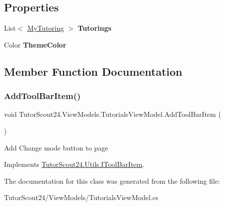 \subsection*{Properties}
\begin{DoxyCompactItemize}
\item 
\mbox{\label{class_tutor_scout24_1_1_view_models_1_1_tutorials_view_model_a119e28d438ac4f7009deb88987a38946}} 
List$<$ \mbox{\hyperlink{class_tutor_scout24_1_1_models_1_1_tutorings_1_1_my_tutoring}{My\+Tutoring}} $>$ {\bfseries Tutorings}
\item 
\mbox{\label{class_tutor_scout24_1_1_view_models_1_1_tutorials_view_model_ac8a656f47cb78d246739e144c3ddec1f}} 
Color {\bfseries Theme\+Color}
\end{DoxyCompactItemize}


\subsection{Member Function Documentation}
\mbox{\label{class_tutor_scout24_1_1_view_models_1_1_tutorials_view_model_aaf327ff2a3c770d55aa0bfa3b50786a7}} 
\subsubsection{\texorpdfstring{Add\+Tool\+Bar\+Item()}{AddToolBarItem()}}
{\footnotesize\ttfamily void Tutor\+Scout24.\+View\+Models.\+Tutorials\+View\+Model.\+Add\+Tool\+Bar\+Item (\begin{DoxyParamCaption}{ }\end{DoxyParamCaption})\hspace{0.3cm}{\ttfamily [inline]}}



Add Change mode button to page 



Implements \mbox{\hyperlink{interface_tutor_scout24_1_1_utils_1_1_i_tool_bar_item}{Tutor\+Scout24.\+Utils.\+I\+Tool\+Bar\+Item}}.



The documentation for this class was generated from the following file\+:\begin{DoxyCompactItemize}
\item 
Tutor\+Scout24/\+View\+Models/Tutorials\+View\+Model.\+cs\end{DoxyCompactItemize}
